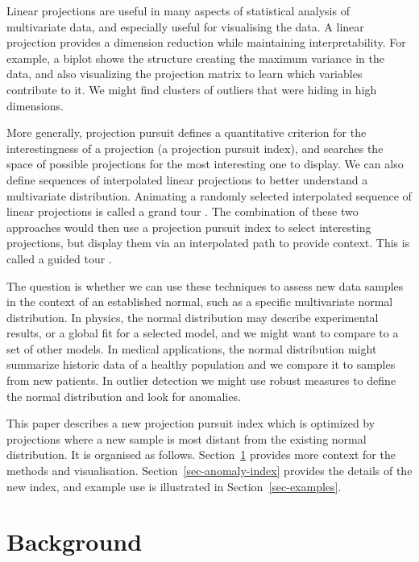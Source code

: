 \documentclass[
  12pt]{article}
\begin{document}
Linear projections are useful in many aspects of statistical analysis of
multivariate data, and especially useful for visualising the data. A
linear projection provides a dimension reduction while maintaining
interpretability. For example, a biplot \citep{Ga71, GH96} shows the
structure creating the maximum variance in the data, and also
visualizing the projection matrix to learn which variables contribute to
it. We might find clusters of outliers that were hiding in high
dimensions.

More generally, projection pursuit \citep{FT74, JS87, Hu85} defines a
quantitative criterion for the interestingness of a projection (a
projection pursuit index), and searches the space of possible
projections for the most interesting one to display. We can also define
sequences of interpolated linear projections to better understand a
multivariate distribution. Animating a randomly selected interpolated
sequence of linear projections is called a grand tour
\citep{As85, BA86b, BCAH05, CLBW06, tours2022}. The combination of these
two approaches would then use a projection pursuit index to select
interesting projections, but display them via an interpolated path to
provide context. This is called a guided tour \citep{cook1995}.

The question is whether we can use these techniques to assess new data
samples in the context of an established normal, such as a specific
multivariate normal distribution. In physics, the normal distribution
may describe experimental results, or a global fit for a selected model,
and we might want to compare to a set of other models. In medical
applications, the normal distribution might summarize historic data of a
healthy population and we compare it to samples from new patients. In
outlier detection we might use robust measures to define the normal
distribution and look for anomalies.

This paper describes a new projection pursuit index which is optimized
by projections where a new sample is most distant from the existing
normal distribution. It is organised as follows.
Section~\ref{sec-background} provides more context for the methods and
visualisation. Section~\ref{sec-anomaly-index} provides the details of
the new index, and example use is illustrated in
Section~\ref{sec-examples}.

\section{Background}\label{sec-background}
\end{document}

